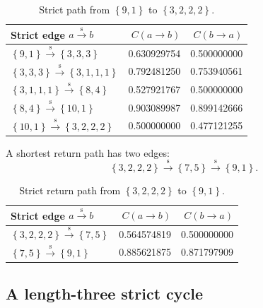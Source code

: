 \documentclass[11pt]{article}
\theoremstyle{definition}
\theoremstyle{remark}
\newcommand{\sig}[1]{\left\{#1\right\}}
\begin{document}
\begin{table}[htbp]
  \centering
  \caption{Strict path from \(\sig{9,1}\) to \(\sig{3,2,2,2}\).}
  \label{tab:strict-path-forward}
  \begin{tabular}{@{}lrr@{}}
    \toprule
    Strict edge \(a\overset{\mathrm{s}}{\longrightarrow}b\)
      & \(C(a\to b)\) & \(C(b\to a)\) \\
    \midrule
    \(\sig{9,1}\overset{\mathrm{s}}{\longrightarrow}\sig{3,3,3}\)
      & 0.630929754 & 0.500000000 \\
    \(\sig{3,3,3}\overset{\mathrm{s}}{\longrightarrow}\sig{3,1,1,1}\)
      & 0.792481250 & 0.753940561 \\
    \(\sig{3,1,1,1}\overset{\mathrm{s}}{\longrightarrow}\sig{8,4}\)
      & 0.527921767 & 0.500000000 \\
    \(\sig{8,4}\overset{\mathrm{s}}{\longrightarrow}\sig{10,1}\)
      & 0.903089987 & 0.899142666 \\
    \(\sig{10,1}\overset{\mathrm{s}}{\longrightarrow}\sig{3,2,2,2}\)
      & 0.500000000 & 0.477121255 \\
    \bottomrule
  \end{tabular}
\end{table}

A shortest return path has two edges:
\[
  \sig{3,2,2,2}
  \overset{\mathrm{s}}{\longrightarrow}\sig{7,5}
  \overset{\mathrm{s}}{\longrightarrow}\sig{9,1}.
\]

\begin{table}[htbp]
  \centering
  \caption{Strict return path from \(\sig{3,2,2,2}\) to \(\sig{9,1}\).}
  \label{tab:strict-path-return}
  \begin{tabular}{@{}lrr@{}}
    \toprule
    Strict edge \(a\overset{\mathrm{s}}{\longrightarrow}b\)
      & \(C(a\to b)\) & \(C(b\to a)\) \\
    \midrule
    \(\sig{3,2,2,2}\overset{\mathrm{s}}{\longrightarrow}\sig{7,5}\)
      & 0.564574819 & 0.500000000 \\
    \(\sig{7,5}\overset{\mathrm{s}}{\longrightarrow}\sig{9,1}\)
      & 0.885621875 & 0.871797909 \\
    \bottomrule
  \end{tabular}
\end{table}

\clearpage
\subsection{A length-three strict cycle}
\end{document}

